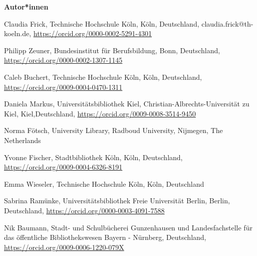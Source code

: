 \documentclass[a4paper,
fontsize=11pt,
oneside,
numbers=noperiodatend,
parskip=half-,
bibliography=totoc,
final
]{scrartcl}
\begin{document}
\textbf{Autor*innen}

Claudia Frick, Technische Hochschule Köln, Köln, Deutschland, claudia.frick@th-koeln.de, \url{https://orcid.org/0000-0002-5291-4301}

Philipp Zeuner, Bundesinstitut für Berufsbildung, Bonn, Deutschland, \url{https://orcid.org/0000-0002-1307-1145}

Caleb Buchert, Technische Hochschule Köln, Köln, Deutschland, \url{https://orcid.org/0009-0004-0470-1311}

Daniela Markus, Universitätsbibliothek Kiel, Christian-Albrechts-Universität zu Kiel, Kiel,\linebreak Deutschland, \url{https://orcid.org/0009-0008-3514-9450}

Norma Fötsch, University Library, Radboud University, Nijmegen, The Netherlands

Yvonne Fischer, Stadtbibliothek Köln, Köln, Deutschland, \url{https://orcid.org/0009-0004-6326-8191}

Emma Wieseler, Technische Hochschule Köln, Köln, Deutschland

Sabrina Ramünke, Universitätsbibliothek Freie Universität Berlin, Berlin, Deutschland, \url{https://orcid.org/0000-0003-4091-7588}

Nik Baumann, Stadt- und Schulbücherei Gunzenhausen und Landesfachstelle für das öffentliche Bibliothekswesen Bayern - Nürnberg, Deutschland, \url{https://orcid.org/0009-0006-1220-079X}
\end{document}
